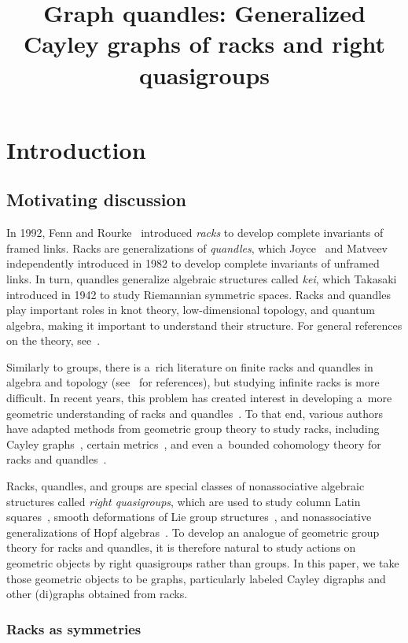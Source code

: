 \documentclass{jonasart}
\title{Graph quandles: Generalized Cayley graphs of racks and right quasigroups}
\begin{document}
	\section {Introduction}

	\subsection{Motivating discussion}

	In 1992, Fenn and Rourke~\cite{fenn} introduced \emph{racks} to develop complete invariants of framed links. Racks are generalizations of \emph{quandles}, which Joyce~\cite{joyce} and Matveev~\cite{matveev} independently introduced in 1982 to develop complete invariants of unframed links. In turn, quandles generalize algebraic structures called \emph{kei}, which Takasaki~\cite{takasaki} introduced in 1942 to study Riemannian symmetric spaces. Racks and quandles play important roles in knot theory, low-dimensional topology, and quantum algebra, making it important to understand their structure. For general references on the theory, see~\cite{book,quandlebook}.

	Similarly to groups, there is a~rich literature on finite racks and quandles in algebra and topology (see~\cite{survey} for references), but studying infinite racks is more difficult. In recent years, this problem has created interest in developing a~more geometric understanding of racks and quandles~\cite{bardakov}. To that end, various authors have adapted methods from geometric group theory to study racks, including Cayley graphs~\cite{metrics}, certain metrics~\cite{metrics, kedra}, and even a~bounded cohomology theory for racks and quandles~\cite{kedra, kapari, saraf}.

	Racks, quandles, and groups are special classes of nonassociative algebraic structures called \emph{right quasigroups}, which are used to study column Latin squares~\cite{Latin}, smooth deformations of Lie group structures~\cite{diff}, and nonassociative generalizations of Hopf algebras~\cite{quantum}. To develop an analogue of geometric group theory for racks and quandles, it is therefore natural to study actions on geometric objects by right quasigroups rather than groups. In this paper, we take those geometric objects to be graphs, particularly labeled Cayley digraphs and other (di)graphs obtained from racks.

	\subsubsection{Racks as symmetries}
    
\end{document}

